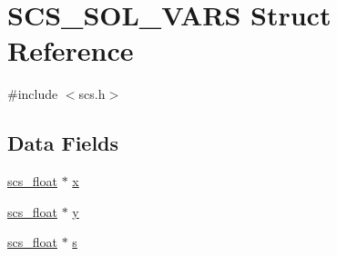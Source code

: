 \hypertarget{struct_s_c_s___s_o_l___v_a_r_s}{\section{S\-C\-S\-\_\-\-S\-O\-L\-\_\-\-V\-A\-R\-S Struct Reference}
\label{struct_s_c_s___s_o_l___v_a_r_s}
}


{\ttfamily \#include $<$scs.\-h$>$}

\subsection*{Data Fields}
\begin{DoxyCompactItemize}
\item 
\hyperlink{glbopts_8h_ad37836e6404bb2c3ae8adcc6290699b9}{scs\-\_\-float} $\ast$ \hyperlink{struct_s_c_s___s_o_l___v_a_r_s_ab2de804a2fdb2a007b99ecdcf502c388}{x}
\item 
\hyperlink{glbopts_8h_ad37836e6404bb2c3ae8adcc6290699b9}{scs\-\_\-float} $\ast$ \hyperlink{struct_s_c_s___s_o_l___v_a_r_s_ae1b7e54f2239aaf72d812f0172bf27d1}{y}
\item 
\hyperlink{glbopts_8h_ad37836e6404bb2c3ae8adcc6290699b9}{scs\-\_\-float} $\ast$ \hyperlink{struct_s_c_s___s_o_l___v_a_r_s_aa3c4c55b3bab23bd2f31398e85ab2ff8}{s}
\end{DoxyCompactItemize}


